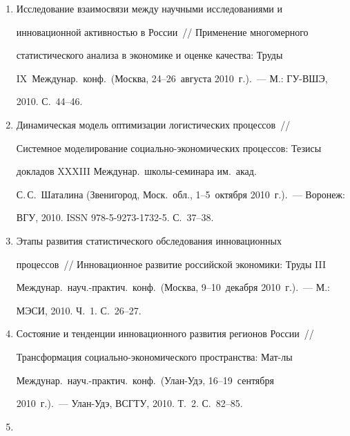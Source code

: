 \begin{enumerate}[1.]
Междунар.\ науч.-техн.\ конф.\ (Орел, 22--23~апреля 2010~г.).~--- Орел: 


ОрелГТУ, 2010. Т.~3. С.~19--24.


\item{}


Исследование взаимосвязи между научными исследованиями и 


инновационной активностью в России~/\!\!/  Применение многомерного 


статистического анализа в экономике и оценке качества: Труды 


IX~Междунар.\ конф.\ (Москва, 24--26~августа 2010~г.).~--- М.: ГУ-ВШЭ, 


2010. С.~44--46.


\item{}


Динамическая модель оптимизации логистических процессов~/\!\!/  


Системное моделирование социально-эко\-но\-ми\-че\-ских процессов: Тезисы 


докладов XXXIII Междунар.\ шко\-лы-се\-ми\-на\-ра им.\ акад.\ 


С.\,С.~Шаталина (Звенигород, Моск.\ обл., 1--5~октября 2010~г.).~--- Воронеж: 


ВГУ, 2010. ISSN 978-5-9273-1732-5. С.~37--38.


\item{}


Этапы развития статистического обследования инновационных 


процессов~/\!\!/  Инновационное развитие российской экономики: Труды III 


Междунар.\ науч.-практич.\ конф.\ (Москва, 9--10~декабря 2010~г.).~--- М.: 


МЭСИ, 2010. Ч.~1. С.~26--27.


\item{}


Состояние и тенденции инновационного развития регионов России~/\!\!/  


Трансформация социально-экономического пространства: Мат-лы 


Междунар.\ науч.-практич.\ конф.\ (Улан-Удэ, 16--19~сентября 


2010~г.).~--- Улан-Удэ, ВСГТУ, 2010. Т.~2. С.~82--85.


\item{}



\end{enumerate}
